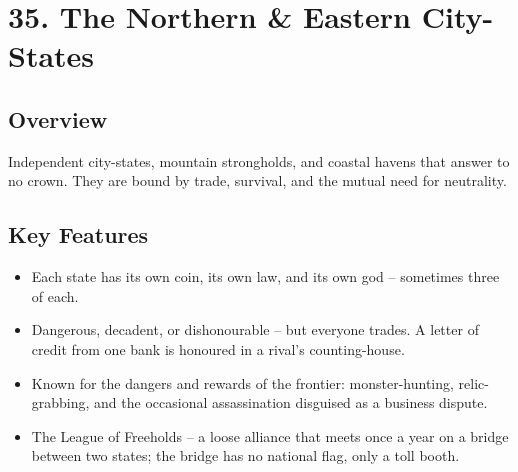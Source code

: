 \documentclass[11pt]{article}
\begin{document}
\section*{35. The Northern \& Eastern City-States}

\subsection*{Overview}
Independent city-states, mountain strongholds, and coastal havens that answer to no crown. They are bound by trade, survival, and the mutual need for neutrality.

\subsection*{Key Features}
\begin{itemize}[leftmargin=*]
    \item Each state has its own coin, its own law, and its own god -- sometimes three of each.
    \item Dangerous, decadent, or dishonourable -- but everyone trades. A letter of credit from one bank is honoured in a rival's counting-house.
    \item Known for the dangers and rewards of the frontier: monster-hunting, relic-grabbing, and the occasional assassination disguised as a business dispute.
    \item The League of Freeholds -- a loose alliance that meets once a year on a bridge between two states; the bridge has no national flag, only a toll booth.
\end{itemize}
\end{document}
